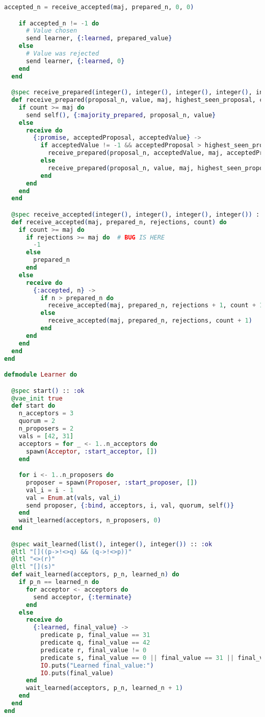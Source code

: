 \begin{lstlisting}[language=Elixir, xleftmargin=.1\linewidth]
    accepted_n = receive_accepted(maj, prepared_n, 0, 0)

    if accepted_n != -1 do
      # Value chosen
      send learner, {:learned, prepared_value}
    else
      # Value was rejected
      send learner, {:learned, 0}
    end
  end

  @spec receive_prepared(integer(), integer(), integer(), integer(), integer()) :: :ok
  def receive_prepared(proposal_n, value, maj, highest_seen_proposal, count) do
    if count >= maj do
      send self(), {:majority_prepared, proposal_n, value}
    else
      receive do
        {:promise, acceptedProposal, acceptedValue} ->
          if acceptedValue != -1 && acceptedProposal > highest_seen_proposal do
            receive_prepared(proposal_n, acceptedValue, maj, acceptedProposal, count + 1)
          else
            receive_prepared(proposal_n, value, maj, highest_seen_proposal, count + 1)
          end
      end
    end
  end

  @spec receive_accepted(integer(), integer(), integer(), integer()) :: integer()
  def receive_accepted(maj, prepared_n, rejections, count) do
    if count >= maj do
      if rejections >= maj do  # BUG IS HERE
        -1
      else
        prepared_n
      end
    else
      receive do
        {:accepted, n} ->
          if n > prepared_n do
            receive_accepted(maj, prepared_n, rejections + 1, count + 1)
          else
            receive_accepted(maj, prepared_n, rejections, count + 1)
          end
      end
    end
  end
end

defmodule Learner do

  @spec start() :: :ok
  @vae_init true
  def start do
    n_acceptors = 3
    quorum = 2
    n_proposers = 2
    vals = [42, 31]
    acceptors = for _ <- 1..n_acceptors do
      spawn(Acceptor, :start_acceptor, [])
    end

    for i <- 1..n_proposers do
      proposer = spawn(Proposer, :start_proposer, [])
      val_i = i - 1
      val = Enum.at(vals, val_i)
      send proposer, {:bind, acceptors, i, val, quorum, self()}
    end
    wait_learned(acceptors, n_proposers, 0)
  end

  @spec wait_learned(list(), integer(), integer()) :: :ok
  @ltl "[]((p->!<>q) && (q->!<>p))"
  @ltl "<>(r)"
  @ltl "[](s)"
  def wait_learned(acceptors, p_n, learned_n) do
    if p_n == learned_n do
      for acceptor <- acceptors do
        send acceptor, {:terminate}
      end
    else
      receive do
        {:learned, final_value} ->
          predicate p, final_value == 31
          predicate q, final_value == 42
          predicate r, final_value != 0
          predicate s, final_value == 0 || final_value == 31 || final_value == 42
          IO.puts("Learned final_value:")
          IO.puts(final_value)
      end
      wait_learned(acceptors, p_n, learned_n + 1)
    end
  end
end

\end{lstlisting}

